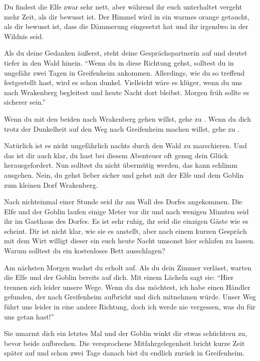 Du findest die Elfe zwar sehr nett, aber während ihr euch unterhaltet vergeht mehr Zeit, als dir bewusst ist. Der Himmel wird in ein warmes orange getaucht, als dir bewusst ist, dass die Dämmerung eingesetzt hat und ihr irgendwo in der Wildnis seid.

Als du deine Gedanken äußerst, steht deine Gesprächspartnerin auf und deutet tiefer in den Wald hinein. ``Wenn du in diese Richtung gehst, solltest du in ungefähr zwei Tagen in Greifenheim ankommen. Allerdings, wie du so treffend festgestellt hast, wird es schon dunkel. Vielleicht wäre es klüger, wenn du uns nach Wrakenberg begleitest und heute Nacht dort bleibst. Morgen früh sollte es sicherer sein.''

Wenn du mit den beiden nach Wrakenberg gehen willst, gehe zu . Wenn du dich trotz der Dunkelheit auf den Weg nach Greifenheim machen willst, gehe zu .


Natürlich ist es nicht ungefährlich nachts durch den Wald zu marschieren.
Und das ist dir auch klar, du hast bei diesem Abenteuer oft genug dein Glück herausgefordert.
Nun solltest du nicht übermütig werden, das kann schlimm ausgehen.
Nein, du gehst lieber sicher und gehst mit der Elfe und dem Goblin zum kleinen Dorf Wrakenberg.

Nach nichteinmal einer Stunde seid ihr am Wall des Dorfes angekommen. Die Elfe und der Goblin laufen einige Meter vor dir und nach wenigen Minuten seid ihr im Gasthaus des Dorfes. Es ist sehr ruhig, ihr seid die einzigen Gäste wie es scheint.
Dir ist nicht klar, wie sie es anstellt, aber nach einem kurzen Gespräch mit dem Wirt willigt dieser ein euch heute Nacht umsonst hier schlafen zu lassen. Warum solltest du ein kostenloses Bett ausschlagen?

Am nächsten Morgen wachst du erholt auf. Als du dein Zimmer verlässt, warten die Elfe und der Goblin bereits auf dich. Mit einem Lächeln sagt sie: ``Hier trennen sich leider unsere Wege. Wenn du das möchtest, ich habe einen Händler gefunden, der nach Greifenheim aufbricht und dich mitnehmen würde. Unser Weg führt uns leider in eine andere Richtung, doch ich werde nie vergessen, was du für uns getan hast!''

Sie umarmt dich ein letztes Mal und der Goblin winkt dir etwas schüchtern zu, bevor beide aufbrechen. Die versprochene Mitfahrgelegenheit bricht kurze Zeit später auf und schon zwei Tage danach bist du endlich zurück in Greifenheim.

